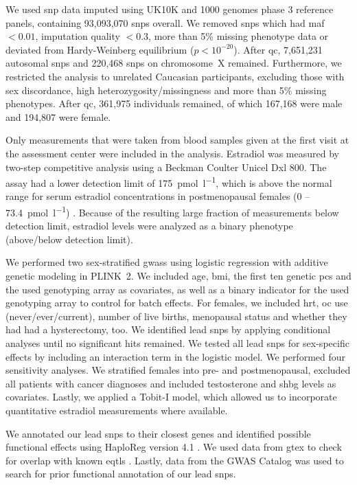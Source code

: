 \documentclass[draft]{scrbook}
\begin{document}
We used \gls{snp} data imputed using UK10K and 1000 genomes phase 3 reference panels, containing 93,093,070 \glspl{snp} overall.
We removed \glspl{snp} which had \gls{maf} $ < 0.01$, imputation quality $ < 0.3 $, more than 5\% missing phenotype data or deviated from Hardy-Weinberg equilibrium ($p < 10^{-20}$).
After \gls{qc}, 7,651,231 autosomal \glspl{snp} and 220,468 \glspl{snp} on chromosome~X remained. Furthermore, we restricted the analysis to unrelated Caucasian participants, excluding those with sex discordance, high heterozygosity/missingness and more than 5\% missing phenotypes. After \gls{qc}, 361,975 individuals remained, of which 167,168 were male and 194,807 were female.

Only measurements that were taken from blood samples given at the first visit at the assessment center were included in the analysis.
Estradiol was measured by two-step competitive analysis using a Beckman Coulter Unicel Dxl 800.
The assay had a lower detection limit of \qty{175}{\pmol\per\litre}, which is above the normal range for serum estradiol concentrations in postmenopausal females (0 -- \qty{73.4}{\pmol\per\litre}) \cite{Nakamoto2010a}.
Because of the resulting large fraction of measurements below detection limit, estradiol levels were analyzed as a binary phenotype (above/below detection limit).

We performed two sex-stratified \glspl{gwas} using logistic regression with additive genetic modeling in \textsf{PLINK~2}.
We included age, \gls{bmi}, the first ten genetic \glspl{pc} and the used genotyping array as covariates, as well as a binary indicator for the used genotyping array to control for batch effects.
For females, we included \gls{hrt}, \gls{oc} use (never/ever/current), number of live births, menopausal status and whether they had had a hysterectomy, too.
We identified lead \glspl{snp} by applying conditional analyses until no significant hits remained.
We tested all lead \glspl{snp} for sex-specific effects by including an interaction term in the logistic model.
We performed four sensitivity analyses.
We stratified females into pre- and postmenopausal, excluded all patients with cancer diagnoses and included testosterone and \gls{shbg} levels as covariates.
Lastly, we applied a Tobit-I model, which allowed us to incorporate quantitative estradiol measurements where available.

We annotated our lead \glspl{snp} to their closest genes and identified possible functional effects using \textsf{HaploReg} version 4.1 \cite{Ward2012}.
We used data from \gls{gtex} to check for overlap with known \glspl{eqtl} \cite{Carithers2015}.
Lastly, data from the GWAS Catalog was used to search for prior functional annotation of our lead \glspl{snp}.
\end{document}
